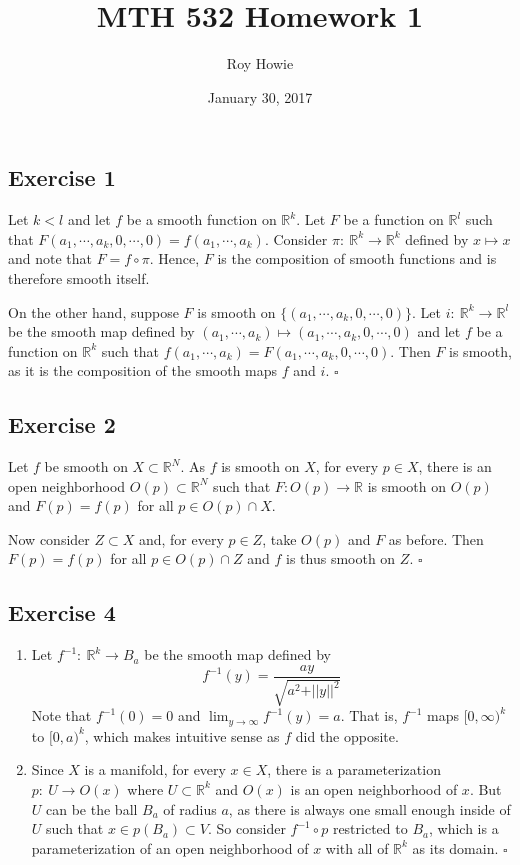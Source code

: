\documentclass{article}
\begin{document}
\title{MTH 532 Homework 1}
\author{Roy Howie}
\date{January 30, 2017}
\maketitle

\subsection*{Exercise 1}
Let $k < l$ and let $f$ be a smooth function on $\mathbb{R}^k$. Let $F$ be a function on
$\mathbb{R}^l$ such that $F(a_1,\cdots,a_k,0,\cdots,0)=f(a_1,\cdots,a_k)$.
Consider $\pi \colon \ \mathbb{R}^k \to \mathbb{R}^k$ defined by $x \mapsto x$ and note
that $F = f \circ \pi$. Hence, $F$ is the composition of smooth functions and is therefore smooth
itself.

On the other hand, suppose  $F$ is smooth on $\{(a_1,\cdots,a_k,0,\cdots,0)\}$.
Let $i \colon \ \mathbb{R}^k \to \mathbb{R}^l$ be the smooth map defined by
$(a_1,\cdots,a_k) \mapsto (a_1,\cdots,a_k,0,\cdots,0)$ and let $f$ be a function on
$\mathbb{R}^k$ such that $f(a_1,\cdots,a_k)=F(a_1,\cdots,a_k,0,\cdots,0)$.
Then $F$ is smooth, as it is the composition of the smooth maps $f$ and $i$.
\hfill $\square$

\subsection*{Exercise 2}
Let $f$ be smooth on $X \subset \mathbb{R}^N$. As $f$ is smooth on $X$,
for every $p \in X$, there is an open neighborhood $O(p) \subset \mathbb{R}^N$ such that 
$F \colon O(p) \to \mathbb{R}$ is smooth on $O(p)$ and $F(p) = f(p)$ for all $p \in O(p) \cap X$.

Now consider $Z \subset X$ and, for every $p \in Z$, take $O(p)$ and $F$ as before. Then
$F(p) = f(p)$ for all $p \in O(p) \cap Z$ and $f$ is thus smooth on $Z$.
\hfill $\square$

\subsection*{Exercise 4}
\begin{enumerate}[label=\textbf{\alph*}]
\item{
	Let $f^{-1} \colon \ \mathbb{R}^k \to B_a$ be the smooth map defined by
	$$f^{-1}(y) = \frac{ay}{\sqrt{a^2 + \vert\vert y \vert\vert^2}}$$
	Note that $f^{-1}(0)=0$ and $\lim_{y\to \infty}f^{-1}(y)=a$.
	That is, $f^{-1}$ maps $[0,\infty)^k$ to $[0,a)^k$, which makes intuitive sense
	as $f$ did the opposite.
}
\item{
	Since $X$ is a manifold, for every $x \in X$, there is a parameterization
	$p \colon \ U \to O(x)$ where $U \subset \mathbb{R}^k$ and $O(x)$ is
	an open neighborhood of $x$. But $U$ can be the ball $B_a$ of radius
	$a$, as there is always one small enough inside of $U$ such that
	$x \in p(B_a) \subset V$. So consider $f^{-1} \circ p$ restricted to $B_a$,
	which is a parameterization of an open neighborhood of $x$ with all of
	$\mathbb{R}^k$ as its domain.
}
\hfill $\square$
\end{enumerate}
\end{document}
